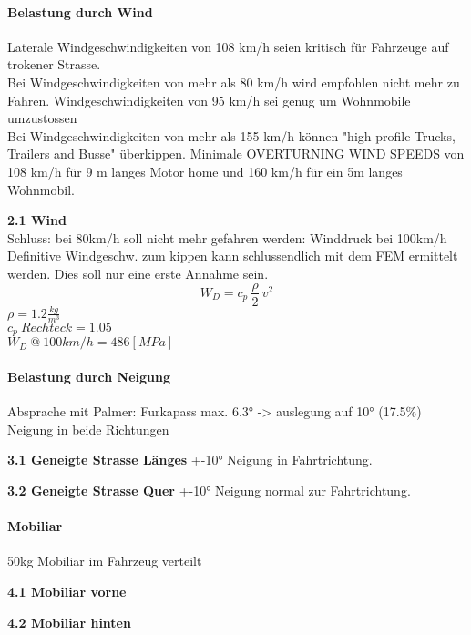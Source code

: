 \paragraph{Belastung durch Wind}

\cite{Wind.1} Laterale Windgeschwindigkeiten von 108 km/h seien kritisch für Fahrzeuge auf trokener Strasse.\\
\cite{Wind.2} Bei Windgeschwindigkeiten von mehr als 80 km/h wird empfohlen nicht mehr zu Fahren. Windgeschwindigkeiten von 95 km/h sei genug um Wohnmobile umzustossen\\
\cite{Wind.3} Bei Windgeschwindigkeiten von mehr als 155 km/h können "high profile Trucks, Trailers and Busse" überkippen. Minimale OVERTURNING WIND SPEEDS von 108 km/h für 9 m langes Motor home und 160 km/h für ein 5m langes Wohnmobil.

\begin{description}
  \item \textbf{2.1 Wind}\\
  Schluss: bei 80km/h soll nicht mehr gefahren werden: Winddruck bei 100km/h\\
  Definitive Windgeschw. zum kippen kann schlussendlich mit dem FEM ermittelt werden. Dies soll nur eine erste Annahme sein.
  \begin{equation}
    \label{Winddruck}
    W_D = c_p \: \frac{\rho}{2}\: v^2
  \end{equation}
  $\rho = 1.2 \frac{kg}{m^3}$\\
  $c_p \: Rechteck = 1.05$\\

  $W_D \:@\: 100 km/h= 486 \left[MPa \right]$
\end{description}

\paragraph{Belastung durch Neigung}
Absprache mit Palmer: Furkapass max. 6.3° -> auslegung auf 10° (17.5\%)
Neigung in beide Richtungen
\begin{description}
  \item \textbf{3.1 Geneigte Strasse Länges} +-10° Neigung in Fahrtrichtung.
  \item \textbf{3.2 Geneigte Strasse Quer} +-10° Neigung normal zur Fahrtrichtung.

\end{description}

\paragraph{Mobiliar}
50kg Mobiliar im Fahrzeug verteilt
\begin{description}
  \item \textbf{4.1 Mobiliar vorne}
  \item \textbf{4.2 Mobiliar hinten}
\end{description}
